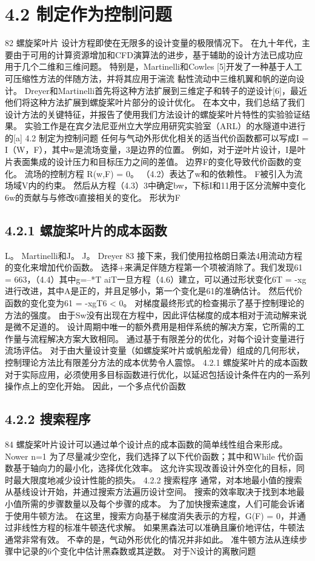 \documentclass[UTF8,11pt,a4paper,openany,fontset=fandol]{ctexbook}
\begin{document}
\section{4.2 制定作为控制问题}
82 螺旋桨叶片 设计方程即使在无限多的设计变量的极限情况下。 在九十年代，主要由于可用的计算资源增加和CFD演算法的进步，基于辅助的设计方法已成功应用于几个二维和三维问题。 特别是，Martinelli和Cowles [5]开发了一种基于人工可压缩性方法的伴随方法，并将其应用于湍流 黏性流动中三维机翼和帆的逆向设计。 Dreyer和Martinelli首先将这种方法扩展到三维定子和转子的逆设计[6]，最近他们将这种方法扩展到螺旋桨叶片部分的设计优化。 在本文中，我们总结了我们设计方法的关键特征，并报告了使用我们方法设计的螺旋桨叶片特性的实验验证结果。 实验工作是在宾夕法尼亚州立大学应用研究实验室（ARL）的水隧道中进行的[a] 4.2 制定为控制问题 任何与气动外形优化相关的适当代价函数都可以写成I = I（W，F），其中w是流场变量，3是边界的位置。 例如，对于逆叶片设计，I是叶片表面集成的设计压力和目标压力之间的差值。 边界F的变化导致代价函数的变化。 流场的控制方程 R(w,F) = 0。 （4.2）表达了w和的依赖性。 F被引入为流场域V内的约束。 然后从方程（4.3）3中确定bw，下标I和11用于区分流解中变化6w的贡献与与修改6直接相关的变化。 形状为F

\subsection{4.2.1 螺旋桨叶片的成本函数}
L。 Martinelli和J。 J。 Dreyer 83 接下来，我们使用拉格朗日乘法4用流动方程的变化来增加代价函数。 选择+来满足伴随方程第一个项被消除了。我们发现61 = 663，（4.4）其中g=--*T aiT一旦方程（4.6）建立，可以通过形状变化6T = -xg进行改进，其中A是正的，并且足够小，第一个变化是61的准确估计。 然后代价函数的变化变为61 = -xgT6 < 0。 对梯度最终形式的检查揭示了基于控制理论的方法的强度。 由于Sw没有出现在方程中，因此评估梯度的成本相对于流动解来说是微不足道的。 设计周期中唯一的额外费用是相伴系统的解决方案，它所需的工作量与流程解决方案大致相同。 通过基于有限差分的优化，对每个设计变量进行流场评估。 对于由大量设计变量（如螺旋桨叶片或帆船龙骨）组成的几何形状，控制理论方法比有限差分方法的成本优势令人震惊。 4.2.1 螺旋桨叶片的成本函数 对于实际应用，必须使用多目标函数进行优化，以延迟包括设计条件在内的一系列操作点上的空化开始。 因此，一个多点代价函数

\subsection{4.2.2 搜索程序}
84 螺旋桨叶片设计可以通过单个设计点的成本函数的简单线性组合来形成。 Nower n=1 为了尽量减少空化，我们选择了以下代价函数；其中和While 代价函数基于轴向力的最小化，选择优化效率。 这允许实现改善设计外空化的目标，同时最大限度地减少设计性能的损失。 4.2.2 搜索程序 通常，对本地最小值的搜索从基线设计开始，并通过搜索方法遍历设计空间。 搜索的效率取决于找到本地最小值所需的步骤数量以及每个步骤的成本。 为了加快搜索速度，人们可能会诉诸于使用牛顿方法。 在这里，搜索方向基于梯度消失表示的方程，G(F) = 0，并通过非线性方程的标准牛顿迭代求解。 如果黑森法可以准确且廉价地评估，牛顿法通常非常有效。 不幸的是，气动外形优化的情况并非如此。 准牛顿方法从连续步骤中记录的6个变化中估计黑森数或其逆数。 对于N设计的离散问题
\end{document}
